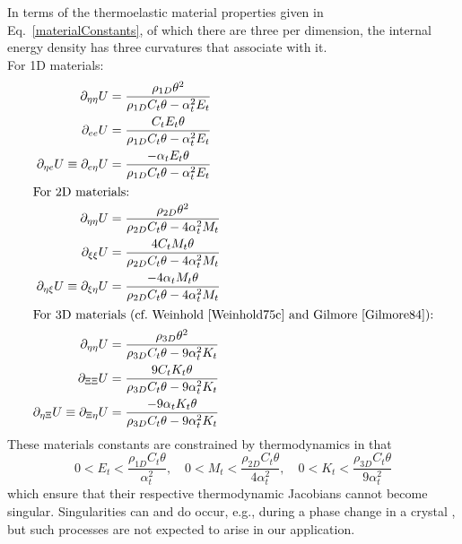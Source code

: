 In terms of the thermo\-elastic material properties given in Eq.~\ref{materialConstants}, of which there are three per dimension, the internal energy density has three curvatures that associate with it. \\  For 1D materials:
\begin{subequations}
    \label{internalEnergies}
    \begin{align}
    \partial_{\eta\eta} U & = 
    \frac{\rho_{1D} \theta^2}
    {\rho_{1D} C_t \theta - \alpha^2_t E_t} \\
    \partial_{ee} U & = \frac{C_t E_t \theta}
    {\rho_{1D} C_t \theta - \alpha^2_t E_t} \\
    \partial_{\eta e} U \equiv \partial_{e \eta} U & = 
    \frac{-\alpha_t E_t \theta}
    {\rho_{1D} C_t \theta - \alpha^2_t E_t} \\
    \intertext{For 2D materials:}
    \partial_{\eta\eta} U & = 
    \frac{\rho_{2D} \theta^2}
    {\rho_{2D} C_t \theta - 4 \alpha^2_t M_t} \\
    \partial_{\xi\xi} U & = \frac{4 C_t M_t \theta}
    {\rho_{2D} C_t \theta - 4 \alpha^2_t M_t} \\
    \partial_{\eta \xi} U \equiv \partial_{\xi \eta} U & = 
    \frac{-4 \alpha_t M_t \theta}
    {\rho_{2D} C_t \theta - 4 \alpha^2_t M_t} \\
    \intertext{For 3D materials (cf.\ Weinhold \cite{Weinhold75c} and Gilmore \cite{Gilmore84}):}
    \partial_{\eta\eta} U & = 
    \frac{\rho_{3D} \theta^2}
    {\rho_{3D} C_t \theta - 9 \alpha^2_t K_t} \\
    \partial_{\Xi\Xi} U & = \frac{9 C_t K_t \theta}
    {\rho_{3D} C_t \theta - 9 \alpha^2_t K_t} \\
    \partial_{\eta\Xi} U \equiv 
    \partial_{\Xi\eta} U & = 
    \frac{-9 \alpha_t K_t \theta}
    {\rho_{3D} C_t \theta - 9 \alpha^2_t K_t}
    \end{align}
\end{subequations}
These materials constants are constrained by thermo\-dynamics in that
\begin{equation}
    \label{thermodynamicConstraints}
    0 < E_t < \frac{\rho_{1D} C_t \theta}{\alpha^2_t} , \quad
    0 < M_t < \frac{\rho_{2D} C_t \theta}{4 \alpha^2_t} , \quad
    0 < K_t < \frac{\rho_{3D} C_t \theta}{9 \alpha^2_t} 
\end{equation} 
which ensure that their respective thermo\-dynamic Jacobians cannot become singular. Singularities can and do occur, e.g., during a phase change in a crystal \cite{McLellan76,Gilmore84}, but such processes are not expected to arise in our application.

